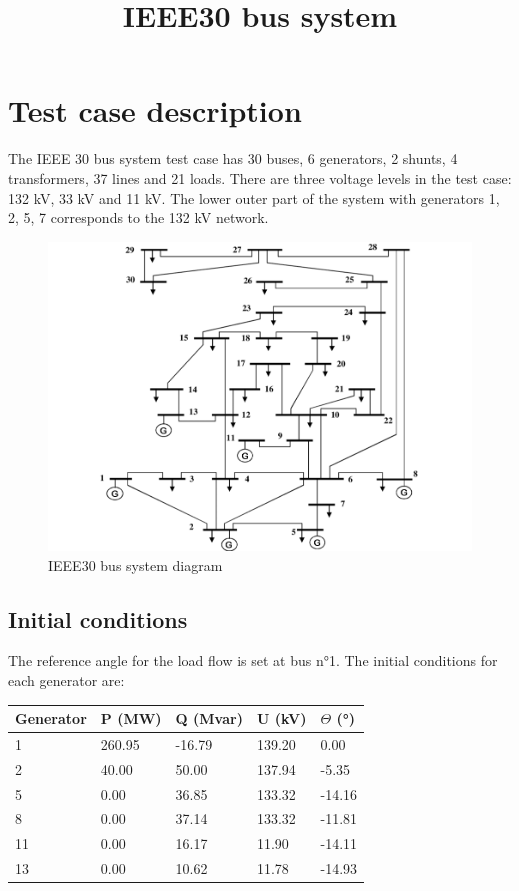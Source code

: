 \documentclass[a4paper, 12pt]{report}
\begin{document}
\title{IEEE30 bus system}

\maketitle

\chapter*{Test case description}

The IEEE 30 bus system test case has 30 buses, 6 generators, 2 shunts, 4 transformers, 37 lines
and 21 loads. There are three voltage levels in the test case: 132 kV, 33 kV and 11 kV. The lower
outer part of the system with generators 1, 2, 5, 7 corresponds to the 132 kV network.

\begin{figure}[H]
  \includegraphics[scale=0.5]{IEEE30BusSystem.png}
  \caption{IEEE30 bus system diagram}
\end{figure}

\section{Initial conditions}

The reference angle for the load flow is set at bus n°1. The initial conditions for each generator
are: \\

\begin{tabular}{ | m{2cm} | m{2cm}| m{2cm} | m{2cm} | m{2cm} | }
  \hline
  \textbf{Generator} & \textbf{P (MW)} & \textbf{Q (Mvar)} & \textbf{U (kV)} & \textbf{$\Theta$ (°)} \\
  \hline
  1 & 260.95 & -16.79 & 139.20 & 0.00 \\
  \hline
  2 & 40.00 & 50.00 & 137.94 & -5.35 \\
  \hline
  5 & 0.00 & 36.85 & 133.32 & -14.16 \\
  \hline
  8 & 0.00 & 37.14 & 133.32 & -11.81 \\
  \hline
  11 & 0.00 & 16.17 & 11.90 & -14.11 \\
  \hline
  13 & 0.00 & 10.62 & 11.78 & -14.93 \\
  \hline
\end{tabular} \\
\end{document}

